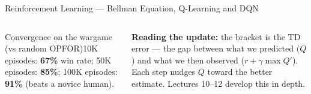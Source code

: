 \documentclass[aspectratio=169,10pt,t]{beamer}
\begin{document}
\begin{frame}{Reinforcement Learning --- Bellman Equation, Q-Learning and DQN}
\begin{columns}[T]
{\begin{tikzpicture}
\end{tikzpicture}}
\begin{cbox}[ISSAgrn]{Convergence on the wargame (vs random OPFOR)}\scriptsize 10K episodes: \textbf{67\%} win rate; 50K episodes: \textbf{85\%}; 100K episodes: \textbf{91\%} (beats a novice human).\end{cbox}
\begin{ibox}\scriptsize\textbf{Reading the update:} the bracket is the TD error --- the gap between what we predicted ($Q$) and what we then observed ($r+\gamma\max Q'$). Each step nudges $Q$ toward the better estimate. Lectures 10--12 develop this in depth.\end{ibox}
\end{columns}
\end{frame}

\end{document}
